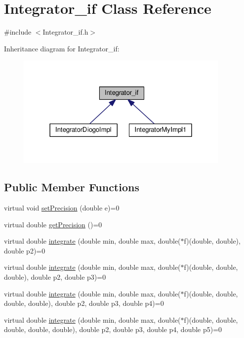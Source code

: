 \hypertarget{class_integrator__if}{\section{Integrator\-\_\-if Class Reference}
\label{class_integrator__if}
}


{\ttfamily \#include $<$Integrator\-\_\-if.\-h$>$}



Inheritance diagram for Integrator\-\_\-if\-:
\nopagebreak
\begin{figure}[H]
\begin{center}
\leavevmode
\includegraphics[width=295pt]{class_integrator__if__inherit__graph}
\end{center}
\end{figure}
\subsection*{Public Member Functions}
\begin{DoxyCompactItemize}
\item 
virtual void \hyperlink{class_integrator__if_a49c27818a4b0caf41c39d22a18b41337}{set\-Precision} (double e)=0
\item 
virtual double \hyperlink{class_integrator__if_af3ab4e8ffa96c8970b2e3c980f84e89d}{get\-Precision} ()=0
\item 
virtual double \hyperlink{class_integrator__if_a841c836fd72d4c428178d1e28a999ec9}{integrate} (double min, double max, double($\ast$f)(double, double), double p2)=0
\item 
virtual double \hyperlink{class_integrator__if_a193d992d6101517249d9bee153607aa6}{integrate} (double min, double max, double($\ast$f)(double, double, double), double p2, double p3)=0
\item 
virtual double \hyperlink{class_integrator__if_a306e4fcb840f789d7a918550fa20cc28}{integrate} (double min, double max, double($\ast$f)(double, double, double, double), double p2, double p3, double p4)=0
\item 
virtual double \hyperlink{class_integrator__if_abaeac01142a4da07ba0f07a52732ac79}{integrate} (double min, double max, double($\ast$f)(double, double, double, double, double), double p2, double p3, double p4, double p5)=0
\end{DoxyCompactItemize}


